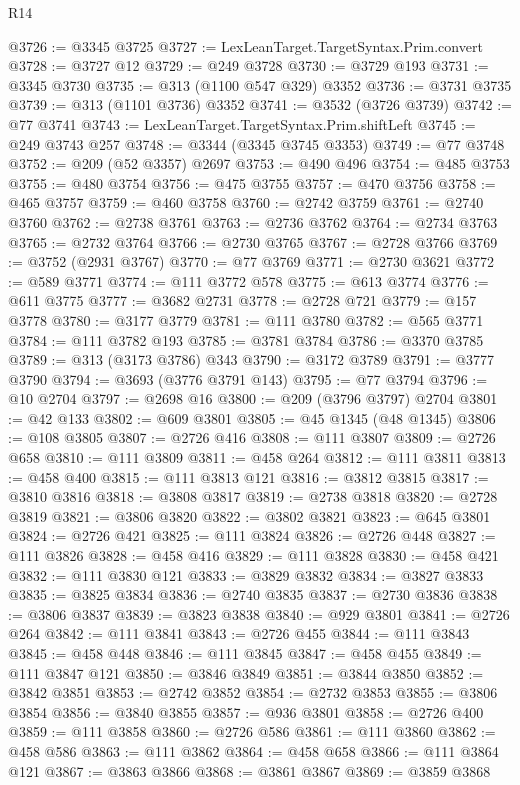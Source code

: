 \begin{lexlean}{R14}
\begin{coremodule}
@3726 := @3345 @3725
@3727 := LexLeanTarget.TargetSyntax.Prim.convert
@3728 := @3727 @12
@3729 := @249 @3728
@3730 := @3729 @193
@3731 := @3345 @3730
@3735 := @313 (@1100 @547 @329) @3352
@3736 := @3731 @3735
@3739 := @313 (@1101 @3736) @3352
@3741 := @3532 (@3726 @3739)
@3742 := @77 @3741
@3743 := LexLeanTarget.TargetSyntax.Prim.shiftLeft
@3745 := @249 @3743 @257
@3748 := @3344 (@3345 @3745 @3353)
@3749 := @77 @3748
@3752 := @209 (@52 @3357) @2697
@3753 := @490 @496
@3754 := @485 @3753
@3755 := @480 @3754
@3756 := @475 @3755
@3757 := @470 @3756
@3758 := @465 @3757
@3759 := @460 @3758
@3760 := @2742 @3759
@3761 := @2740 @3760
@3762 := @2738 @3761
@3763 := @2736 @3762
@3764 := @2734 @3763
@3765 := @2732 @3764
@3766 := @2730 @3765
@3767 := @2728 @3766
@3769 := @3752 (@2931 @3767)
@3770 := @77 @3769
@3771 := @2730 @3621
@3772 := @589 @3771
@3774 := @111 @3772 @578
@3775 := @613 @3774
@3776 := @611 @3775
@3777 := @3682 @2731
@3778 := @2728 @721
@3779 := @157 @3778
@3780 := @3177 @3779
@3781 := @111 @3780
@3782 := @565 @3771
@3784 := @111 @3782 @193
@3785 := @3781 @3784
@3786 := @3370 @3785
@3789 := @313 (@3173 @3786) @343
@3790 := @3172 @3789
@3791 := @3777 @3790
@3794 := @3693 (@3776 @3791 @143)
@3795 := @77 @3794
@3796 := @10 @2704
@3797 := @2698 @16
@3800 := @209 (@3796 @3797) @2704
@3801 := @42 @133
@3802 := @609 @3801
@3805 := @45 @1345 (@48 @1345)
@3806 := @108 @3805
@3807 := @2726 @416
@3808 := @111 @3807
@3809 := @2726 @658
@3810 := @111 @3809
@3811 := @458 @264
@3812 := @111 @3811
@3813 := @458 @400
@3815 := @111 @3813 @121
@3816 := @3812 @3815
@3817 := @3810 @3816
@3818 := @3808 @3817
@3819 := @2738 @3818
@3820 := @2728 @3819
@3821 := @3806 @3820
@3822 := @3802 @3821
@3823 := @645 @3801
@3824 := @2726 @421
@3825 := @111 @3824
@3826 := @2726 @448
@3827 := @111 @3826
@3828 := @458 @416
@3829 := @111 @3828
@3830 := @458 @421
@3832 := @111 @3830 @121
@3833 := @3829 @3832
@3834 := @3827 @3833
@3835 := @3825 @3834
@3836 := @2740 @3835
@3837 := @2730 @3836
@3838 := @3806 @3837
@3839 := @3823 @3838
@3840 := @929 @3801
@3841 := @2726 @264
@3842 := @111 @3841
@3843 := @2726 @455
@3844 := @111 @3843
@3845 := @458 @448
@3846 := @111 @3845
@3847 := @458 @455
@3849 := @111 @3847 @121
@3850 := @3846 @3849
@3851 := @3844 @3850
@3852 := @3842 @3851
@3853 := @2742 @3852
@3854 := @2732 @3853
@3855 := @3806 @3854
@3856 := @3840 @3855
@3857 := @936 @3801
@3858 := @2726 @400
@3859 := @111 @3858
@3860 := @2726 @586
@3861 := @111 @3860
@3862 := @458 @586
@3863 := @111 @3862
@3864 := @458 @658
@3866 := @111 @3864 @121
@3867 := @3863 @3866
@3868 := @3861 @3867
@3869 := @3859 @3868

\end{coremodule}
\end{lexlean}
